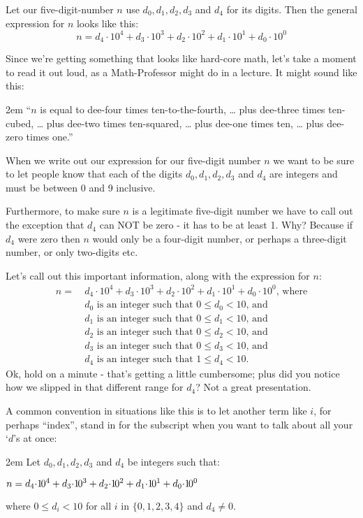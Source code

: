 \documentclass{article}
\newenvironment{jprIn}{\begin{adjustwidth}{2em}{}}{\end{adjustwidth}}
\begin{document}
Let our five-digit-number $n$ use $d_0,d_1,d_2,d_3$ and $d_4$ for its digits. Then
the general expression for $n$ looks like this:
\[n=d_4{\cdot}10^4+d_3{\cdot}10^3+d_2{\cdot}10^2+d_1{\cdot}10^1+d_0{\cdot}10^0\]

Since we're getting something that looks like hard-core math, let's take a moment
to read it out loud, as a Math-Professor might do in a lecture.  It might sound like this:
\begin{jprIn}
``$n$ is equal to dee-four times ten-to-the-fourth, \dots{}
plus dee-three times ten-cubed, \dots{} plus dee-two times ten-squared,  \dots{} plus dee-one times ten,  \dots{} plus dee-zero times one.''
\end{jprIn}

When we write out our expression for our five-digit number $n$ we want to be sure
to let people know that each of the digits $d_0,d_1,d_2,d_3$ and $d_4$
are integers and must be between 0 and 9 inclusive.

Furthermore, to make sure $n$ is a legitimate five-digit number we have to
call out the exception that $d_4$ can NOT be zero - it has to be at least 1.
Why? Because if $d_4$ were zero then $n$ would only be a
four-digit number, or perhaps a three-digit number, or only two-digits etc.

Let's call out this important information, along with the expression for $n$:
\begin{align*}
n =\ &d_4{\cdot}10^4+d_3{\cdot}10^3+d_2{\cdot}10^2+d_1{\cdot}10^1+d_0{\cdot}10^0\text{, where}\\
& d_0\text{ is an integer such that }0\le{}d_0<10\text{, and}\\
& d_1\text{ is an integer such that }0\le{}d_1<10\text{, and}\\
& d_2\text{ is an integer such that }0\le{}d_2<10\text{, and}\\
& d_3\text{ is an integer such that }0\le{}d_3<10\text{, and}\\
& d_4\text{ is an integer such that }1\le{}d_4<10.
\end{align*}
Ok, hold on a minute - that's getting a little cumbersome;
plus did  you notice how we slipped in that different range for $d_4$?
Not a great presentation.

A common convention in situations like this
is to let another term like $i$, for perhaps ``index'', stand in for the subscript
when you want to talk about all your `$d$'s at once:
\begin{jprIn}
Let $d_0, d_1, d_2,d_3$ and $d_4$ be integers such that:

\hspace{3em}$n=d_4{\cdot}{1\hspace{-0.12em}0}^4+d_3{\cdot}{1\hspace{-0.12em}0}^3+d_2{\cdot}{1\hspace{-0.12em}0}^2+d_1{\cdot}{1\hspace{-0.12em}0}^1+d_0{\cdot}{1\hspace{-0.12em}0}^0$

where $0\le{}d_i<10$ for all $i$ in $\{0,1,2,3,4\}$ and $d_4\ne0$.
\end{jprIn}
\end{document}
